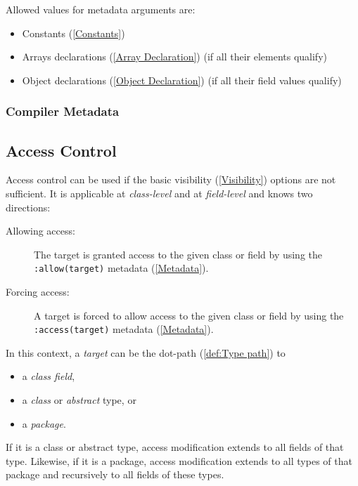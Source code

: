 \documentclass{article}
\newcommand{\expr}[1]{\texttt{#1}}
\newcommand{\tref}[2]{#1 (\ref{#2})}
\begin{document}
Allowed values for metadata arguments are:

\begin{itemize}
	\item \tref{Constants}{Constants}
	\item \tref{Arrays declarations}{Array Declaration} (if all their elements qualify)
	\item \tref{Object declarations}{Object Declaration} (if all their field values qualify)
\end{itemize}

\subsubsection{Compiler Metadata}

\subsection{Access Control}
\label{Access Control}

Access control can be used if the basic \tref{visibility}{Visibility} options are not sufficient. It is applicable at \emph{class-level} and at \emph{field-level} and knows two directions:

\begin{description}
	\item[Allowing access:] The target is granted access to the given class or field by using the \expr{:allow(target)} \tref{metadata}{Metadata}.
	\item[Forcing access:] A target is forced to allow access to the given class or field by using the \expr{:access(target)} \tref{metadata}{Metadata}.
\end{description}

In this context, a \emph{target} can be the \tref{dot-path}{def:Type path} to

\begin{itemize}
	\item a \emph{class field},
	\item a \emph{class} or \emph{abstract} type, or
	\item a \emph{package}.
\end{itemize}

If it is a class or abstract type, access modification extends to all fields of that type. Likewise, if it is a package, access modification extends to all types of that package and recursively to all fields of these types.


\end{document}
